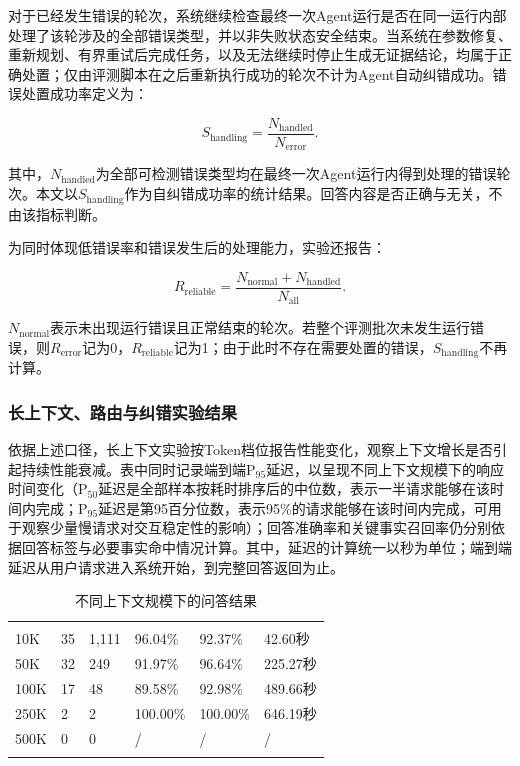 对于已经发生错误的轮次，系统继续检查最终一次Agent运行是否在同一运行内部处理了该轮涉及的全部错误类型，并以非失败状态安全结束。当系统在参数修复、重新规划、有界重试后完成任务，以及无法继续时停止生成无证据结论，均属于正确处置；仅由评测脚本在之后重新执行成功的轮次不计为Agent自动纠错成功。错误处置成功率定义为：

\[
S_{\mathrm{handling}}=\frac{N_{\mathrm{handled}}}{N_{\mathrm{error}}}.
\]

其中，$N_{\mathrm{handled}}$为全部可检测错误类型均在最终一次Agent运行内得到处理的错误轮次。本文以$S_{\mathrm{handling}}$作为自纠错成功率的统计结果。回答内容是否正确与无关，不由该指标判断。

为同时体现低错误率和错误发生后的处理能力，实验还报告：

\[
R_{\mathrm{reliable}}=
\frac{N_{\mathrm{normal}}+N_{\mathrm{handled}}}{N_{\mathrm{all}}}.
\]

$N_{\mathrm{normal}}$表示未出现运行错误且正常结束的轮次。若整个评测批次未发生运行错误，则$R_{\mathrm{error}}$记为0，$R_{\mathrm{reliable}}$记为1；由于此时不存在需要处置的错误，$S_{\mathrm{handling}}$不再计算。

\subsubsection{长上下文、路由与纠错实验结果}

依据上述口径，长上下文实验按Token档位报告性能变化，观察上下文增长是否引起持续性能衰减。表中同时记录端到端$\mathrm{P}_{95}$延迟，以呈现不同上下文规模下的响应时间变化（$\mathrm{P}_{50}$延迟是全部样本按耗时排序后的中位数，表示一半请求能够在该时间内完成；$\mathrm{P}_{95}$延迟是第95百分位数，表示95\%的请求能够在该时间内完成，可用于观察少量慢请求对交互稳定性的影响）；回答准确率和关键事实召回率仍分别依据回答标签与必要事实命中情况计算。其中，延迟的计算统一以秒为单位；端到端延迟从用户请求进入系统开始，到完整回答返回为止。

\begin{table}[htbp]
  \centering
  \caption{不同上下文规模下的问答结果}
  \label{tab:context-results}
  \footnotesize
  \setlength{\tabcolsep}{2.5pt}
  \begin{tabular}{@{}C{.24\textwidth}*{5}{C{.13\textwidth}}@{}}
    \fintracetoprule
     &  &  &  &  &  \\
    \fintracemidrule
    10K & 35 & 1,111 & 96.04\% & 92.37\% & 42.60秒 \\
    50K & 32 & 249 & 91.97\% & 96.64\% & 225.27秒 \\
    100K & 17 & 48 & 89.58\% & 92.98\% & 489.66秒 \\
    250K & 2 & 2 & 100.00\% & 100.00\% & 646.19秒 \\
    500K & 0 & 0 & / & / & / \\
    \fintracebottomrule
  \end{tabular}
\end{table}

